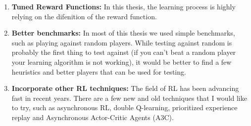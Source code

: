\begin{enumerate}

    \item \textbf{Tuned Reward Functions:} In this thesis, the learning process is highly relying on the difenition of the reward function.
    
    \item \textbf{Better benchmarks:} In most of this thesis we used simple benchmarks, such as playing against random players. While testing against random is probably the first thing to test against (if you can't beat a random player your learning algorithm is not working), it would be better to find a few heuristics and better players that can be used for testing.

    \item \textbf{Incorporate other RL techniques:} The field of RL has been advancing fast in recent years. There are a few new and old techniques that I would like to try, such as asynchronous RL, double Q-learning, prioritized experience replay and Asynchronous Actor-Critic Agents (A3C).

\end{enumerate}
